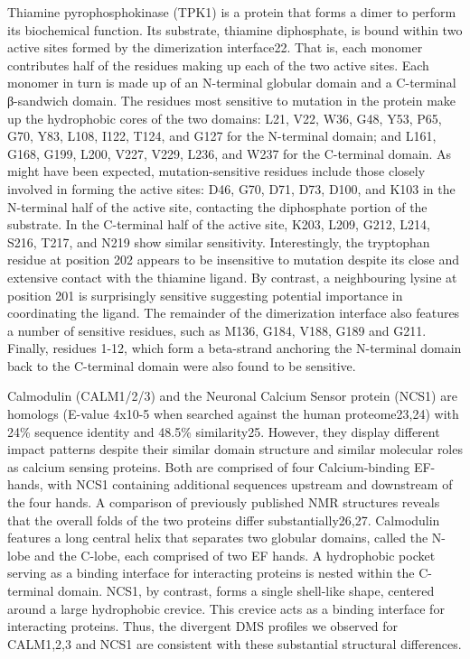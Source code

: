 Thiamine pyrophosphokinase (TPK1) is a protein that forms a dimer to perform its biochemical function. Its substrate, thiamine diphosphate, is bound within two active sites formed by the dimerization interface22. That is, each monomer contributes half of the residues making up each of the two active sites.  Each monomer in turn is made up of an N-terminal globular domain and a C-terminal β-sandwich domain. The residues most sensitive to mutation in the protein make up the hydrophobic cores of the two domains: L21, V22, W36, G48, Y53, P65, G70, Y83, L108, I122, T124, and G127 for the N-terminal domain; and L161, G168, G199, L200, V227, V229, L236, and W237 for the C-terminal domain. As might have been expected, mutation-sensitive residues include those closely involved in forming the active sites: D46, G70, D71, D73, D100, and K103 in the N-terminal half of the active site, contacting the diphosphate portion of the substrate. In the C-terminal half of the active site, K203, L209, G212, L214, S216, T217, and N219 show similar sensitivity. Interestingly, the tryptophan residue at position 202 appears to be insensitive to mutation despite its close and extensive contact with the thiamine ligand. By contrast, a neighbouring lysine at position 201 is surprisingly sensitive suggesting potential importance in coordinating the ligand.  The remainder of the dimerization interface also features a number of sensitive residues, such as M136, G184, V188, G189 and G211. Finally, residues 1-12, which form a beta-strand anchoring the N-terminal domain back to the C-terminal domain were also found to be sensitive.

Calmodulin (CALM1/2/3) and the Neuronal Calcium Sensor protein (NCS1) are homologs (E-value 4x10-5 when searched against the human proteome23,24) with 24\% sequence identity and 48.5\% similarity25. However, they display different impact patterns despite their similar domain structure and similar molecular roles as calcium sensing proteins. Both are comprised of four Calcium-binding EF-hands, with NCS1 containing additional sequences upstream and downstream of the four hands. A comparison of previously published NMR structures reveals that the overall folds of the two proteins differ substantially26,27. Calmodulin features a long central helix that separates two globular domains, called the N-lobe and the C-lobe, each comprised of two EF hands. A hydrophobic pocket serving as a binding interface for interacting proteins is nested within the C-terminal domain. NCS1, by contrast, forms a single shell-like shape, centered around a large hydrophobic crevice. This crevice acts as a binding interface for interacting proteins. Thus, the divergent DMS profiles we observed for CALM1,2,3 and NCS1 are consistent with these substantial structural differences.

